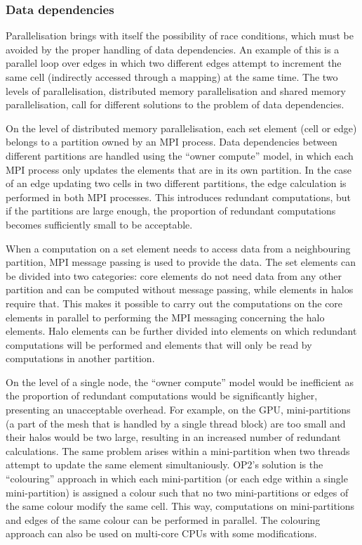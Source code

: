 \documentclass[fontsize=11pt, appendixprefix=true]{scrreprt}
\begin{document}
\subsubsection{Data dependencies}

Parallelisation brings with itself the possibility of race conditions, which
must be avoided by the proper handling of data dependencies. An example of this
is a parallel loop over edges in which two different edges attempt to increment
the same cell (indirectly accessed through a mapping) at the same time. The two
levels of parallelisation, distributed memory parallelisation and shared memory
parallelisation, call for different solutions to the problem of data
dependencies.

On the level of distributed memory parallelisation, each set element (cell or
edge) belongs to a partition owned by an MPI process. Data dependencies between
different partitions are handled using the ``owner compute'' model, in which
each MPI process only updates the elements that are in its own partition. In the
case of an edge updating two cells in two different partitions, the edge
calculation is performed in both MPI processes. This introduces redundant
computations, but if the partitions are large enough, the proportion of
redundant computations becomes sufficiently small to be acceptable.

When a computation on a set element needs to access data from a neighbouring
partition, MPI message passing is used to provide the data. The set elements can
be divided into two categories: core elements do not need data from any other
partition and can be computed without message passing, while elements in halos
require that. This makes it possible to carry out the computations on the core
elements in parallel to performing the MPI messaging concerning the halo
elements. Halo elements can be further divided into elements on which redundant
computations will be performed and elements that will only be read by
computations in another partition.

On the level of a single node, the ``owner compute'' model would be inefficient
as the proportion of redundant computations would be significantly higher,
presenting an unacceptable overhead. For example, on the GPU, mini-partitions (a
part of the mesh that is handled by a single thread block) are too small and
their halos would be two large, resulting in an increased number of redundant
calculations. The same problem arises within a mini-partition when two threads
attempt to update the same element simultaniously. OP2's solution is the
``colouring'' approach in which each mini-partition (or each edge within a
single mini-partition) is assigned a colour such that no two mini-partitions or
edges of the same colour modify the same cell. This way, computations on
mini-partitions and edges of the same colour can be performed in parallel. The
colouring approach can also be used on multi-core CPUs with some modifications.
\end{document}
